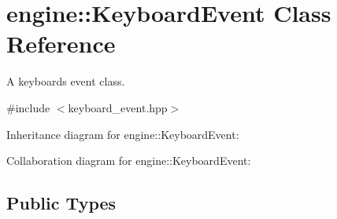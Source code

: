 \hypertarget{classengine_1_1_keyboard_event}{}\section{engine\+:\+:Keyboard\+Event Class Reference}
\label{classengine_1_1_keyboard_event}


A keyboard\textquotesingle{}s event class.  




{\ttfamily \#include $<$keyboard\+\_\+event.\+hpp$>$}



Inheritance diagram for engine\+:\+:Keyboard\+Event\+:


Collaboration diagram for engine\+:\+:Keyboard\+Event\+:
\subsection*{Public Types}
